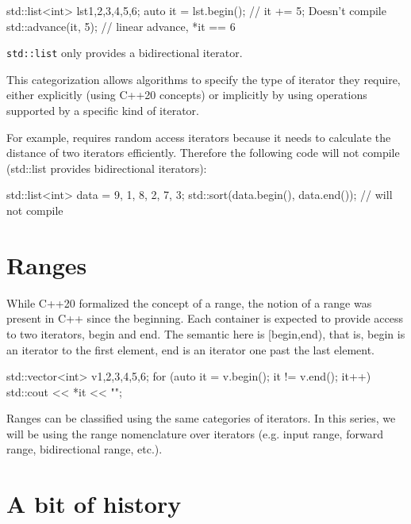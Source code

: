 \begin{box-note}
\begin{cppcode}
std::list<int> lst{1,2,3,4,5,6};
auto it = lst.begin();
// it += 5; Doesn't compile
std::advance(it, 5); // linear advance, *it == 6
\end{cppcode}
\noindent\small\texttt{std::list} only provides a bidirectional iterator.
\end{box-note}

This categorization allows algorithms to specify the type of iterator they require, either explicitly (using C++20 concepts) or implicitly by using operations supported by a specific kind of iterator.

For example, \emph{} requires random access iterators because it needs to calculate the distance of two iterators efficiently. Therefore the following code will not compile (std::list provides bidirectional iterators):

\begin{box-note}
\begin{cppcode}
std::list<int> data = { 9, 1, 8, 2, 7, 3};
std::sort(data.begin(), data.end()); // will not compile
\end{cppcode}
\end{box-note}

\section{Ranges}

While C++20 formalized the concept of a range, the notion of a range was present in C++ since the beginning. Each container is expected to provide access to two iterators, begin and end. The semantic here is [begin,end), that is, begin is an iterator to the first element, end is an iterator one past the last element.

\begin{box-note}
\begin{cppcode}
std::vector<int> v{1,2,3,4,5,6};
for (auto it = v.begin(); it != v.end(); it++) {
    std::cout << *it << "\n";
}
\end{cppcode}
\end{box-note}

Ranges can be classified using the same categories of iterators. In this series, we will be using the range nomenclature over iterators (e.g. input range, forward range, bidirectional range, etc.).

\section{A bit of history}

